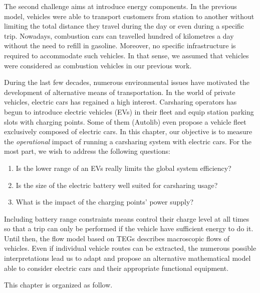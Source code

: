 \begin{bibunit}[ieeetr]
\bigskip
The second challenge aims at introduce energy components.
In the previous model, vehicles were able to transport customers from station to another without limiting the total distance they travel during the day or even during a specific trip.
Nowadays, combustion cars can travelled hundred of kilometres a day without the need to refill in gasoline.
Moreover, no specific infrastructure is required to accommodate such vehicles.
In that sense, we assumed that vehicles were considered as combustion vehicles in our previous work.

During the last few decades, numerous environmental issues have motivated the development of alternative means of transportation.
In the world of private vehicles, electric cars has regained a high interest.
Carsharing operators has begun to introduce electric vehicles (EVs) in their fleet and equip station parking slots with charging points.
Some of them (\eg Autolib) even propose a vehicle fleet exclusively composed of electric cars.
In this chapter, our objective is to measure the \emph{operational} impact of running a carsharing system with electric cars.
For the most part, we wish to address the following questions:
\begin{enumerate}
\item Is the lower range of an EVs really limits the global system efficiency?
\item Is the size of the electric battery well suited for carsharing usage?
\item What is the impact of the charging points' power supply?
\end{enumerate}
Including battery range constraints means control their charge level at all times so that a trip can only be performed if the vehicle have sufficient energy to do it.
Until then, the flow model based on TEGs describes macroscopic flows of vehicles.
Even if individual vehicle routes can be extracted, the numerous possible interpretations lead us to adapt and propose an alternative mathematical model able to consider electric cars and their appropriate functional equipment.

\bigskip
This chapter is organized as follow.



\end{bibunit}
